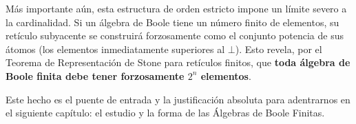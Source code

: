 Más importante aún, esta estructura de orden estricto impone un límite severo a la cardinalidad. Si un álgebra de Boole tiene un número finito de elementos, su retículo subyacente se construirá forzosamente como el conjunto potencia de sus átomos (los elementos inmediatamente superiores al $\bot$). Esto revela, por el Teorema de Representación de Stone para retículos finitos, que \textbf{toda álgebra de Boole finita debe tener forzosamente $2^n$ elementos}. 

Este hecho es el puente de entrada y la justificación absoluta para adentrarnos en el siguiente capítulo: el estudio y la forma de las Álgebras de Boole Finitas.
